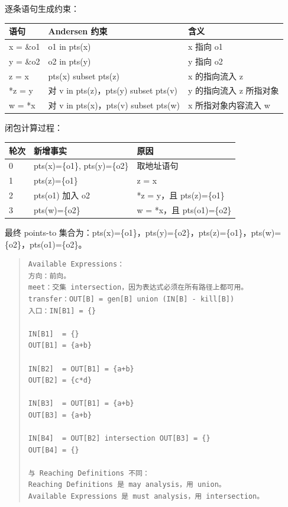 \documentclass[UTF8,zihao=-4]{ctexart}
\newcommand{\answerquestion}[2]{\par\vspace{0.75em}\noindent{\large\bfseries 题目 #1 #2}\par\vspace{0.35em}}
\begin{document}
逐条语句生成约束：

\begin{center}
\footnotesize
\begin{tabular}{lll}
\hline
语句 & Andersen 约束 & 含义 \\
\hline
x = \&o1 & o1 in pts(x) & x 指向 o1 \\
y = \&o2 & o2 in pts(y) & y 指向 o2 \\
z = x & pts(x) subset pts(z) & x 的指向流入 z \\
*z = y & 对 v in pts(z)，pts(y) subset pts(v) & y 的指向流入 z 所指对象 \\
w = *x & 对 v in pts(x)，pts(v) subset pts(w) & x 所指对象内容流入 w \\
\hline
\end{tabular}
\end{center}

闭包计算过程：

\begin{center}
\footnotesize
\begin{tabular}{lll}
\hline
轮次 & 新增事实 & 原因 \\
\hline
0 & pts(x)=\{o1\}, pts(y)=\{o2\} & 取地址语句 \\
1 & pts(z)=\{o1\} & z = x \\
2 & pts(o1) 加入 o2 & *z = y，且 pts(z)=\{o1\} \\
3 & pts(w)=\{o2\} & w = *x，且 pts(o1)=\{o2\} \\
\hline
\end{tabular}
\end{center}

最终 points-to 集合为：pts(x)=\{o1\}，pts(y)=\{o2\}，pts(z)=\{o1\}，pts(w)=\{o2\}，pts(o1)=\{o2\}。



\answerquestion{7}{PPT 新增重点答案}


\begin{quote}
\footnotesize
\begin{verbatim}
Available Expressions：
方向：前向。
meet：交集 intersection，因为表达式必须在所有路径上都可用。
transfer：OUT[B] = gen[B] union (IN[B] - kill[B])
入口：IN[B1] = {}

IN[B1]  = {}
OUT[B1] = {a+b}

IN[B2]  = OUT[B1] = {a+b}
OUT[B2] = {c*d}

IN[B3]  = OUT[B1] = {a+b}
OUT[B3] = {a+b}

IN[B4]  = OUT[B2] intersection OUT[B3] = {}
OUT[B4] = {}

与 Reaching Definitions 不同：
Reaching Definitions 是 may analysis，用 union。
Available Expressions 是 must analysis，用 intersection。
\end{verbatim}
\end{quote}
\end{document}
